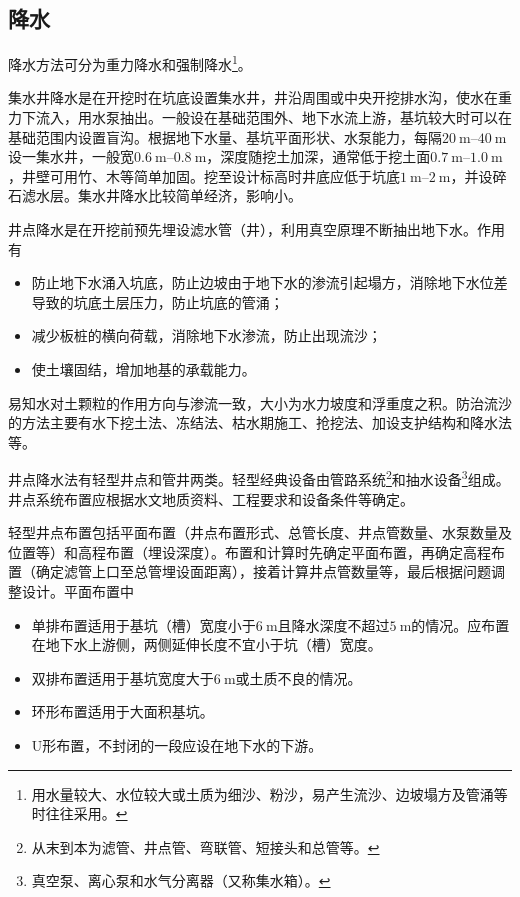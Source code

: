 \documentclass{book}
\begin{document}
\subsection{降水}
\par 降水方法可分为重力降水和强制降水\footnote{用水量较大、水位较大或土质为细沙、粉沙，易产生流沙、边坡塌方及管涌等时往往采用。}。
\par 集水井降水是在开挖时在坑底设置集水井，井沿周围或中央开挖排水沟，使水在重力下流入，用水泵抽出。一般设在基础范围外、地下水流上游，基坑较大时可以在基础范围内设置盲沟。根据地下水量、基坑平面形状、水泵能力，每隔$\SIrange{20}{40}{\m}$设一集水井，一般宽$\SIrange{0.6}{0.8}{\m}$，深度随挖土加深，通常低于挖土面$\SIrange{0.7}{1.0}{\m}$，井壁可用竹、木等简单加固。挖至设计标高时井底应低于坑底$\SIrange{1}{2}{\m}$，并设碎石滤水层。集水井降水比较简单经济，影响小。
\par 井点降水是在开挖前预先埋设滤水管（井），利用真空原理不断抽出地下水。作用有
\begin{itemize}
    \item 防止地下水涌入坑底，防止边坡由于地下水的渗流引起塌方，消除地下水位差导致的坑底土层压力，防止坑底的管涌；
    \item 减少板桩的横向荷载，消除地下水渗流，防止出现流沙；
    \item 使土壤固结，增加地基的承载能力。
\end{itemize}
\par 易知水对土颗粒的作用方向与渗流一致，大小为水力坡度和浮重度之积。防治流沙的方法主要有水下挖土法、冻结法、枯水期施工、抢挖法、加设支护结构和降水法等。
\par 井点降水法有轻型井点和管井两类。轻型经典设备由管路系统\footnote{从末到本为滤管、井点管、弯联管、短接头和总管等。}和抽水设备\footnote{真空泵、离心泵和水气分离器（又称集水箱）。}组成。井点系统布置应根据水文地质资料、工程要求和设备条件等确定。
\par 轻型井点布置包括平面布置（井点布置形式、总管长度、井点管数量、水泵数量及位置等）和高程布置（埋设深度）。布置和计算时先确定平面布置，再确定高程布置（确定滤管上口至总管埋设面距离），接着计算井点管数量等，最后根据问题调整设计。平面布置中
\begin{itemize}
    \item 单排布置适用于基坑（槽）宽度小于$\SI{6}{\m}$且降水深度不超过$\SI{5}{\m}$的情况。应布置在地下水上游侧，两侧延伸长度不宜小于坑（槽）宽度。
    \item 双排布置适用于基坑宽度大于$\SI{6}{\m}$或土质不良的情况。
    \item 环形布置适用于大面积基坑。
    \item U形布置，不封闭的一段应设在地下水的下游。
\end{itemize}
\end{document}
